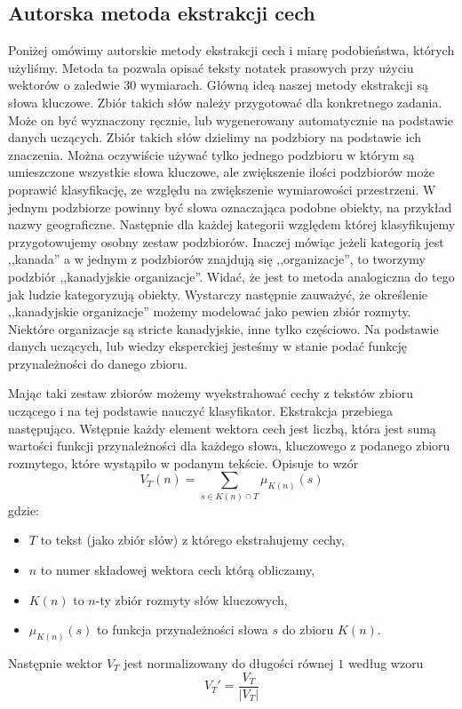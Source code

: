\documentclass[a4paper]{classrep}
\begin{document}
\subsection{Autorska metoda ekstrakcji cech}
\label{sec:autorska}
Poniżej omówimy autorskie metody ekstrakcji cech i miarę podobieństwa, których użyliśmy. Metoda ta pozwala opisać teksty notatek prasowych przy użyciu wektorów o zaledwie \(30\) wymiarach.
Główną ideą naszej metody ekstrakcji są słowa kluczowe. Zbiór takich słów należy przygotować dla konkretnego zadania. Może on być wyznaczony ręcznie,
lub wygenerowany automatycznie na podstawie danych uczących. Zbiór takich słów dzielimy na podzbiory na podstawie ich znaczenia. Można oczywiście używać tylko jednego podzbioru
w którym są umieszczone wszystkie słowa kluczowe, ale zwiększenie ilości podzbiorów może poprawić klasyfikację, ze względu na zwiększenie wymiarowości przestrzeni. 
W jednym podzbiorze powinny być słowa oznaczająca podobne obiekty, na przykład nazwy geograficzne. Następnie dla każdej kategorii względem której klasyfikujemy przygotowujemy
osobny zestaw podzbiorów. Inaczej mówiąc jeżeli kategorią jest ,,kanada'' a w jednym z podzbiorów znajdują się ,,organizacje'', to tworzymy podzbiór ,,kanadyjskie organizacje''.
Widać, że jest to metoda analogiczna do tego jak ludzie kategoryzują obiekty. Wystarczy następnie zauważyć, że określenie ,,kanadyjskie organizacje'' możemy modelować
jako pewien zbiór rozmyty. Niektóre organizacje są stricte kanadyjskie, inne tylko częściowo. Na podstawie danych uczących, lub wiedzy eksperckiej jesteśmy w stanie podać
funkcję przynależności do danego zbioru.

Mając taki zestaw zbiorów możemy wyekstrahować cechy z tekstów zbioru uczącego i na tej podstawie nauczyć klasyfikator. Ekstrakcja przebiega następująco. Wstępnie każdy element wektora
cech jest liczbą, która jest sumą wartości funkcji przynależności dla każdego słowa, kluczowego z podanego zbioru rozmytego, które wystąpiło w podanym tekście.
Opisuje to wzór
\begin{equation}
V_T(n)=\sum_{s\in K(n) \cap T} \mu_{K(n)}(s)
\end{equation}
gdzie:
\begin{itemize}
\item \(T\) to tekst (jako zbiór słów) z którego ekstrahujemy cechy,
\item \(n\) to numer składowej wektora cech którą obliczamy,
\item \(K(n)\) to \(n\)-ty zbiór rozmyty słów kluczowych,
\item \(\mu_{K(n)}(s)\) to funkcja przynależności słowa \(s\) do zbioru \(K(n)\).
\end{itemize}
\noindent Następnie wektor \(V_T\) jest normalizowany do długości równej \(1\) według wzoru
\begin{equation}
V_T' = \frac{V_T}{|V_T|}
\end{equation}
\end{document}

